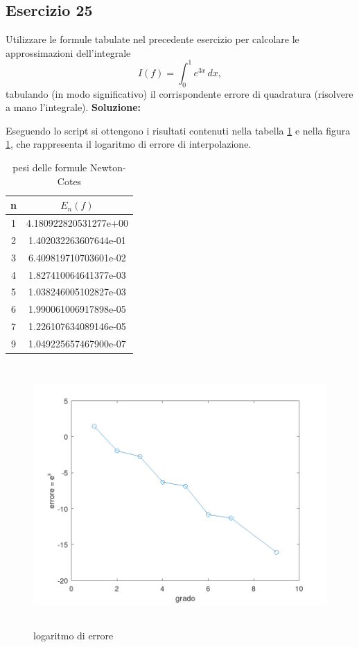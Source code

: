 \subsection{Esercizio 25}
Utilizzare le formule tabulate nel precedente esercizio per calcolare le approssimazioni dell'integrale
\[
    I(f) = \int_{0}^{1} e^{3x}\,dx,
\]
tabulando (in modo significativo) il corrispondente errore di quadratura (risolvere a mano l'integrale).
\newline \textbf{Soluzione:}

Eseguendo lo script  si ottengono i risultati contenuti nella tabella \ref{tab:25}
e nella figura \ref{fig:es25}, che rappresenta il logaritmo di errore di interpolazione.
\begin{table}[h]
    \centering
    \renewcommand\arraystretch{2}
    \begin{tabular}{| c | c |}
        \hline
        n & $E_n(f)$              \\
        \hline
        1 & 4.180922820531277e+00 \\
        2 & 1.402032263607644e-01 \\
        3 & 6.409819710703601e-02 \\
        4 & 1.827410064641377e-03 \\
        5 & 1.038246005102827e-03 \\
        6 & 1.990061006917898e-05 \\
        7 & 1.226107634089146e-05 \\
        9 & 1.049225657467900e-07 \\
        \hline
    \end{tabular}
    \caption{pesi delle formule Newton-Cotes}
    \label{tab:25}
\end{table}
\begin{figure}[!ht]
    \centering
    \includegraphics[width=16cm,height=10cm,keepaspectratio]{capitolo5/es25_figure.png}
    \caption{logaritmo di errore}
    \label{fig:es25}
\end{figure}
\FloatBarrier
